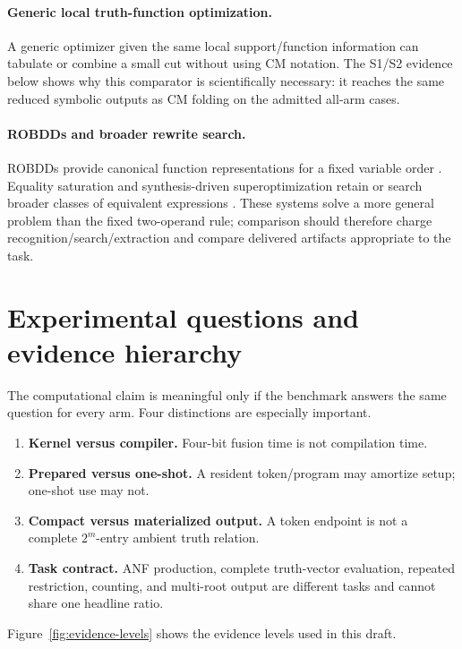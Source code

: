 \documentclass[10pt]{article}
\theoremstyle{plain}
\theoremstyle{definition}
\theoremstyle{remark}
\begin{document}
\paragraph{Generic local truth-function optimization.}
A generic optimizer given the same local support/function information can tabulate or combine a small cut without using CM notation. The S1/S2 evidence below shows why this comparator is scientifically necessary: it reaches the same reduced symbolic outputs as CM folding on the admitted all-arm cases.

\paragraph{ROBDDs and broader rewrite search.}
ROBDDs provide canonical function representations for a fixed variable order \cite{Bryant1986}. Equality saturation and synthesis-driven superoptimization retain or search broader classes of equivalent expressions \cite{Willsey2021,Sasnauskas2017}. These systems solve a more general problem than the fixed two-operand rule; comparison should therefore charge recognition/search/extraction and compare delivered artifacts appropriate to the task.

\section{Experimental questions and evidence hierarchy}
\label{sec:evaluation}

The computational claim is meaningful only if the benchmark answers the same question for every arm. Four distinctions are especially important.

\begin{enumerate}
 \item \textbf{Kernel versus compiler.} Four-bit fusion time is not compilation time.
 \item \textbf{Prepared versus one-shot.} A resident token/program may amortize setup; one-shot use may not.
 \item \textbf{Compact versus materialized output.} A token endpoint is not a complete $2^m$-entry ambient truth relation.
 \item \textbf{Task contract.} ANF production, complete truth-vector evaluation, repeated restriction, counting, and multi-root output are different tasks and cannot share one headline ratio.
\end{enumerate}

Figure~\ref{fig:evidence-levels} shows the evidence levels used in this draft.
\end{document}

